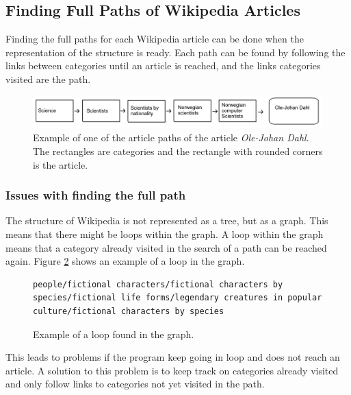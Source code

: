 \subsection{Finding Full Paths of Wikipedia Articles}
Finding the full paths for each Wikipedia article can be done when the representation of the structure is ready. Each path can be found by following the links between categories until an article is reached, and the links categories visited are the path. 

\begin{figure}[h]
\centering
\includegraphics[width=\textwidth]{Chapters/Implementation/example_path}
\caption[Example of an article path]{Example of one of the article paths of the article \emph{Ole-Johan Dahl}. The rectangles are categories and the rectangle with rounded corners is the article. }
\label{fig:examplepath}
\end{figure}

\subsubsection{Issues with finding the full path}
The structure of Wikipedia is not represented as a tree, but as a graph. This means that there might be loops within the graph. A loop within the graph means that a category already visited in the search of a path can be reached again. Figure \ref{fig:exampleloop} shows an example of a loop in the graph. 

\begin{figure}[h]
\centering
\begin{lstlisting}
people/fictional characters/fictional characters by species/fictional life forms/legendary creatures in popular culture/fictional characters by species
\end{lstlisting}
\caption{Example of a loop found in the graph.}
\label{fig:exampleloop}
\end{figure}


This leads to problems if the program keep going in loop and does not reach an article. A solution to this problem is to keep track on categories already visited and only follow links to categories not yet visited in the path. 

